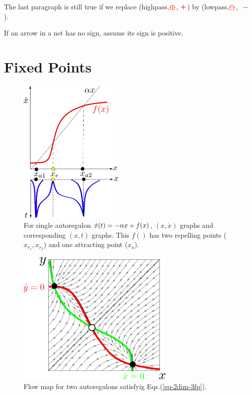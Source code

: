 The last paragraph is still true if we replace (highpass,${\color{red}\bm\oplus}$, 
${\color{red}\bm +}$) by 
(lowpass,${\color{red}\bm\ominus}$, 
${\color{red}\bm{\;-\;}}$).

If an arrow in a net has no sign, assume its sign is positive.



\section{Fixed Points}

\begin{figure}[h!]
\centering
\includegraphics[width=2in]
{autoregulons/source-sink-source.png}
\caption{For single autoregulon $\dot{x}(t)=-\alpha x + f(x)$, $(x, \dot{x})$ graphs and 
corresponding $(x,t)$ graphs. This $f()$ has
two repelling  points ($x_{r_1}, x_{r_2}$) 
and one attracting  point ($x_a$).
}
\label{fig-source-sink-source}
\end{figure}

\begin{figure}[h!]
\centering
\includegraphics[width=3in]
{autoregulons/2dim-3fp.png}
\caption{Flow map for two autoregulons satisfyig Eqs.(\ref{eq-2dim-3fp}).}
\label{fig-2dim-3fp}
\end{figure}

